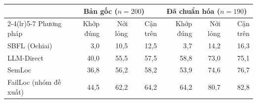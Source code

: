 \begin{tabular}{lrrrrrr}
\toprule
 & \multicolumn{3}{c}{Bản gốc ($n=200$)} & \multicolumn{3}{c}{Đã chuẩn hóa ($n=190$)} \\
\cmidrule(lr){2-4}\cmidrule(lr){5-7}
Phương pháp & Khớp đúng & Nới lỏng & Cận trên & Khớp đúng & Nới lỏng & Cận trên \\
\midrule
SBFL (Ochiai) & 3,0 & 10,5 & 12,5 & 3,7 & 14,2 & 16,3 \\
LLM-Direct & 40,0 & 55,5 & 57,5 & 58,8 & 73,0 & 75,1 \\
SemLoc & 36,8 & 56,2 & 58,2 & 53,9 & 74,6 & 76,7 \\
FailLoc (nhóm đề xuất) & 44,5 & 62,2 & 64,2 & 64,2 & 80,7 & 82,8 \\
\bottomrule
\end{tabular}
